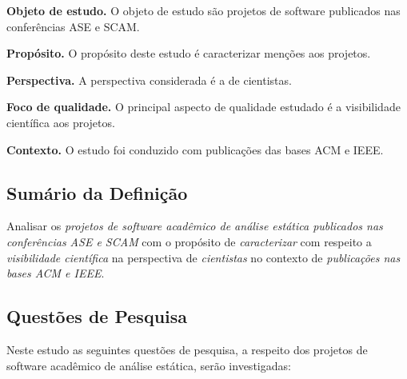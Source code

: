 \begin{description}
\item{\bf Objeto de estudo.} 
O objeto de estudo são projetos de software publicados nas conferências ASE e SCAM.

\item{\bf Propósito.} 
O propósito deste estudo é caracterizar menções aos projetos.

\item{\bf Perspectiva.} 
A perspectiva considerada é a de cientistas.

\item{\bf Foco de qualidade.} 
O principal aspecto de qualidade estudado é a visibilidade científica aos projetos.

\item{\bf Contexto.} 
O estudo foi conduzido com publicações das bases ACM e IEEE.
\end{description}

\subsection{Sumário da Definição}

Analisar os \textit{projetos de software acadêmico de análise estática publicados nas conferências ASE e SCAM}
com o propósito de \textit{caracterizar}
com respeito a \textit{visibilidade científica}
na perspectiva de \textit{cientistas}
no contexto de \textit{publicações nas bases ACM e IEEE}.

\subsection{Questões de Pesquisa}

Neste estudo as seguintes questões de pesquisa, a respeito dos projetos de
software acadêmico de análise estática, serão investigadas:

\newcommand{\EstudoDoisQuestaoUm}{Como os projetos de software acadêmico de
análise estática publicados nas conferências ASE e SCAM são mencionados em
publicações encontradas nas bases ACM e IEEE ao longo dos anos?}

\newcommand{\EstudoDoisQuestaoDois}{Os projetos de software acadêmico de
análise estática publicados nas conferências ASE e SCAM são utilizados em
estudos encontrados nas bases ACM e IEEE?}

\newcommand{\EstudoDoisQuestaoTres}{Os projetos de software acadêmico de
análise estática publicados nas conferências ASE e SCAM recebem contribuições
de estudos encontrados nas bases ACM e IEEE?}

